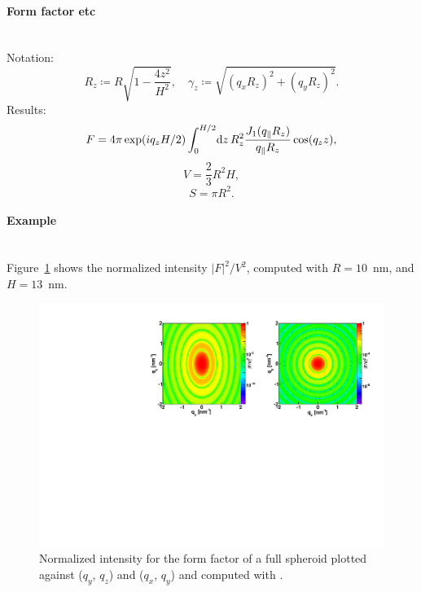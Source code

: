 \paragraph{Form factor etc}\strut\\
Notation:
\begin{equation*}
 R_z \coloneqq R\sqrt{1-\frac{4z^2}{H^2}},\quad
 \gamma_z \coloneqq \sqrt{(q_x R_z)^2+(q_y R_z)^2}.  
\end{equation*}
Results:
\begin{equation*}
  F = 4\pi \exp(i q_z H/2) \int_0^{H/2} \!\text{d} z\,
     R_z^2 \frac{J_1(q_{\parallel}R_z)}{q_{\parallel}R_z} \cos(q_z z),
\end{equation*}
\begin{equation*}
  V =\dfrac{2}{3}R^2H,
\end{equation*}
\begin{equation*}
  S =\pi R^2.
\end{equation*}

\paragraph{Example}\strut\\
Figure~\ref{fig:FFfspheroidEx} shows the normalized intensity
$|F|^2/V^2$, computed with $R=10$~nm, and $H=13$~nm.
\begin{figure}[H]
\begin{center}
\includegraphics[angle=-90,width=\textwidth]{fig/ff/figfffspheroid.pdf}
\end{center}
\caption{Normalized intensity for the form factor of a full spheroid plotted against ($q_y$, $q_z$) and ($q_x$, $q_y$) and
  computed with .}
\label{fig:FFfspheroidEx}
\end{figure}

